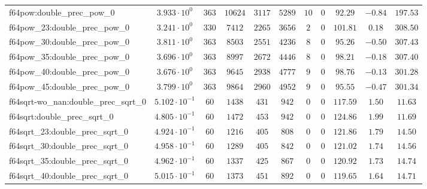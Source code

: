\begin{tabular}{|l|c|c|c|c|c|c|c|c|c|c|}
f64pow:double\_prec\_pow\_0                    & $ 3.933 \cdot 10^{0}  $ & $ 363    $ & $ 10624  $ & $ 3117  $ & $ 5289  $ & $ 10  $ & $ 0 $ & $ 92.29       $ & $ -0.84   $ & $ 197.53  $ \\
f64pow\_23:double\_prec\_pow\_0                & $ 3.241 \cdot 10^{0}  $ & $ 330    $ & $ 7412   $ & $ 2265  $ & $ 3656  $ & $ 2   $ & $ 0 $ & $ 101.81      $ & $ 0.18    $ & $ 308.50  $ \\
f64pow\_30:double\_prec\_pow\_0                & $ 3.811 \cdot 10^{0}  $ & $ 363    $ & $ 8503   $ & $ 2551  $ & $ 4236  $ & $ 8   $ & $ 0 $ & $ 95.26       $ & $ -0.50   $ & $ 307.43  $ \\
f64pow\_35:double\_prec\_pow\_0                & $ 3.696 \cdot 10^{0}  $ & $ 363    $ & $ 8997   $ & $ 2672  $ & $ 4446  $ & $ 8   $ & $ 0 $ & $ 98.21       $ & $ -0.18   $ & $ 307.40  $ \\
f64pow\_40:double\_prec\_pow\_0                & $ 3.676 \cdot 10^{0}  $ & $ 363    $ & $ 9645   $ & $ 2938  $ & $ 4777  $ & $ 9   $ & $ 0 $ & $ 98.76       $ & $ -0.13   $ & $ 301.28  $ \\
f64pow\_45:double\_prec\_pow\_0                & $ 3.799 \cdot 10^{0}  $ & $ 363    $ & $ 9864   $ & $ 2960  $ & $ 4952  $ & $ 9   $ & $ 0 $ & $ 95.55       $ & $ -0.47   $ & $ 301.34  $ \\
f64sqrt-wo\_nan:double\_prec\_sqrt\_0          & $ 5.102 \cdot 10^{-1} $ & $ 60     $ & $ 1438   $ & $ 431   $ & $ 942   $ & $ 0   $ & $ 0 $ & $ 117.59      $ & $ 1.50    $ & $ 11.63   $ \\
f64sqrt:double\_prec\_sqrt\_0                  & $ 4.805 \cdot 10^{-1} $ & $ 60     $ & $ 1472   $ & $ 453   $ & $ 942   $ & $ 0   $ & $ 0 $ & $ 124.86      $ & $ 1.99    $ & $ 11.69   $ \\
f64sqrt\_23:double\_prec\_sqrt\_0              & $ 4.924 \cdot 10^{-1} $ & $ 60     $ & $ 1216   $ & $ 405   $ & $ 808   $ & $ 0   $ & $ 0 $ & $ 121.86      $ & $ 1.79    $ & $ 14.50   $ \\
f64sqrt\_30:double\_prec\_sqrt\_0              & $ 4.958 \cdot 10^{-1} $ & $ 60     $ & $ 1289   $ & $ 405   $ & $ 842   $ & $ 0   $ & $ 0 $ & $ 121.02      $ & $ 1.74    $ & $ 14.56   $ \\
f64sqrt\_35:double\_prec\_sqrt\_0              & $ 4.962 \cdot 10^{-1} $ & $ 60     $ & $ 1337   $ & $ 425   $ & $ 867   $ & $ 0   $ & $ 0 $ & $ 120.92      $ & $ 1.73    $ & $ 14.74   $ \\
f64sqrt\_40:double\_prec\_sqrt\_0              & $ 5.015 \cdot 10^{-1} $ & $ 60     $ & $ 1373   $ & $ 451   $ & $ 892   $ & $ 0   $ & $ 0 $ & $ 119.65      $ & $ 1.64    $ & $ 14.71   $ \\

\end{tabular}
